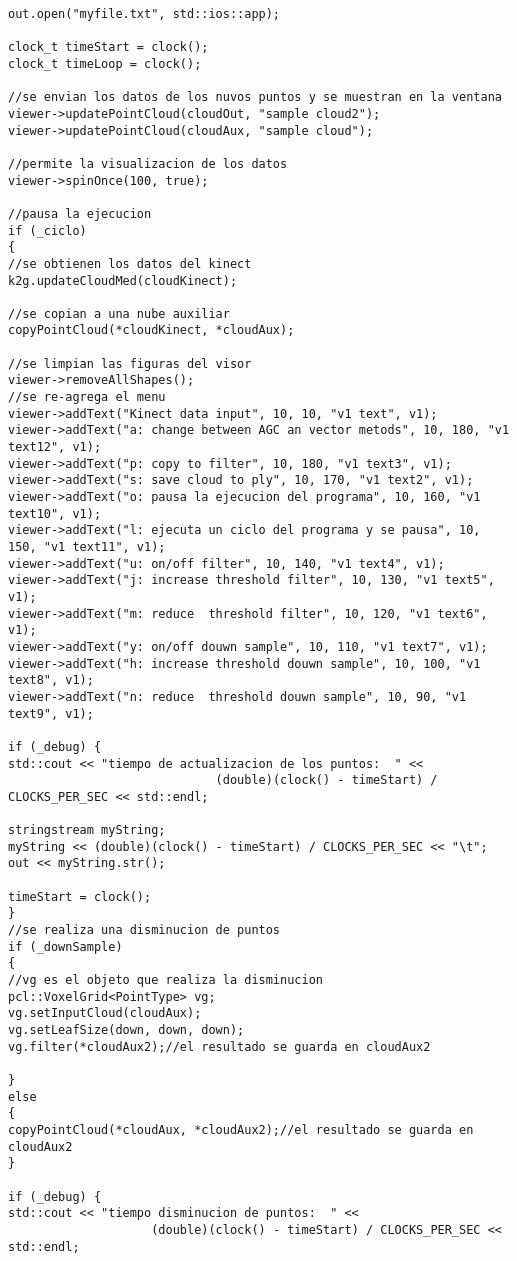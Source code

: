 {\begin{lstlisting}[caption={Archivo test.cpp}]
out.open("myfile.txt", std::ios::app);

clock_t timeStart = clock();
clock_t timeLoop = clock();

//se envian los datos de los nuvos puntos y se muestran en la ventana
viewer->updatePointCloud(cloudOut, "sample cloud2");
viewer->updatePointCloud(cloudAux, "sample cloud");

//permite la visualizacion de los datos 
viewer->spinOnce(100, true);

//pausa la ejecucion
if (_ciclo)
{
//se obtienen los datos del kinect
k2g.updateCloudMed(cloudKinect);

//se copian a una nube auxiliar
copyPointCloud(*cloudKinect, *cloudAux);

//se limpian las figuras del visor
viewer->removeAllShapes();
//se re-agrega el menu
viewer->addText("Kinect data input", 10, 10, "v1 text", v1);
viewer->addText("a: change between AGC an vector metods", 10, 180, "v1 text12", v1);
viewer->addText("p: copy to filter", 10, 180, "v1 text3", v1);
viewer->addText("s: save cloud to ply", 10, 170, "v1 text2", v1);
viewer->addText("o: pausa la ejecucion del programa", 10, 160, "v1 text10", v1);
viewer->addText("l: ejecuta un ciclo del programa y se pausa", 10, 150, "v1 text11", v1);
viewer->addText("u: on/off filter", 10, 140, "v1 text4", v1);
viewer->addText("j: increase threshold filter", 10, 130, "v1 text5", v1);
viewer->addText("m: reduce  threshold filter", 10, 120, "v1 text6", v1);
viewer->addText("y: on/off douwn sample", 10, 110, "v1 text7", v1);
viewer->addText("h: increase threshold douwn sample", 10, 100, "v1 text8", v1);
viewer->addText("n: reduce  threshold douwn sample", 10, 90, "v1 text9", v1);

if (_debug) {
std::cout << "tiempo de actualizacion de los puntos:  " <<
							 (double)(clock() - timeStart) / CLOCKS_PER_SEC << std::endl;

stringstream myString;
myString << (double)(clock() - timeStart) / CLOCKS_PER_SEC << "\t";
out << myString.str();

timeStart = clock();
}
//se realiza una disminucion de puntos
if (_downSample)
{
//vg es el objeto que realiza la disminucion
pcl::VoxelGrid<PointType> vg;
vg.setInputCloud(cloudAux);
vg.setLeafSize(down, down, down);
vg.filter(*cloudAux2);//el resultado se guarda en cloudAux2

}
else
{
copyPointCloud(*cloudAux, *cloudAux2);//el resultado se guarda en cloudAux2
}

if (_debug) {
std::cout << "tiempo disminucion de puntos:  " << 
					(double)(clock() - timeStart) / CLOCKS_PER_SEC << std::endl;


\end{lstlisting}}
